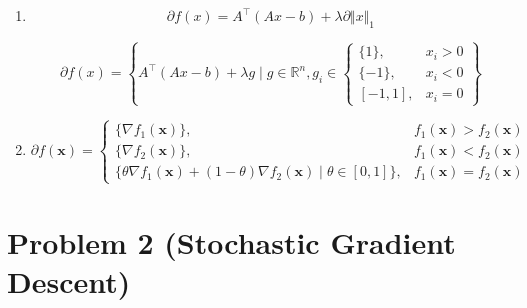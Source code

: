 \documentclass[11pt,a4paper]{article}
\begin{document}
\begin{enumerate}
    $$
    d f = g'(x)^\top dx
    $$
    
    $$
    \partial f(x) = g'(x)^\top
    =
    \begin{pmatrix}
        \partial \vert x_1 \vert ,&
        \cdots ,&
        \partial \vert x_n \vert
    \end{pmatrix}
    $$

    $$
    \partial \Vert x \Vert _1
    =
    \left\{
    g \in \mathbb{R}^n 
    \mid
    g_i
    \in
    \begin{cases}
        \{1\}, & x_i > 0 \\
        \{-1\}, & x_i < 0 \\
        [-1, 1], & x_i = 0
    \end{cases}
    \right\}
    $$

    \item

    $$
    \partial f(x)
    = A^\top (Ax - b) + \lambda \partial \Vert x \Vert _1
    $$

    $$
    \partial f(x)
    =
    \left\{
    A^\top (Ax - b) + \lambda g
    \mid
    g \in \mathbb{R}^n,
    g_i
    \in
    \begin{cases}
        \{1\}, & x_i > 0 \\
        \{-1\}, & x_i < 0 \\
        [-1, 1], & x_i = 0
    \end{cases}
    \right\}
    $$

    \item

    $$
    \partial f(\mathbf{x})
    =
    \begin{cases}
        \{ \nabla f_1(\mathbf{x}) \}, & f_1(\mathbf{x}) > f_2(\mathbf{x}) \\
        \{ \nabla f_2(\mathbf{x}) \}, & f_1(\mathbf{x}) < f_2(\mathbf{x}) \\
        \{ \theta \nabla f_1(\mathbf{x}) + (1 - \theta) \nabla f_2(\mathbf{x}) \mid \theta \in [0, 1] \}, & f_1(\mathbf{x}) = f_2(\mathbf{x})
    \end{cases}
    $$
\end{enumerate}


\newpage



\section*{Problem 2 (Stochastic Gradient Descent)}
\end{document}
